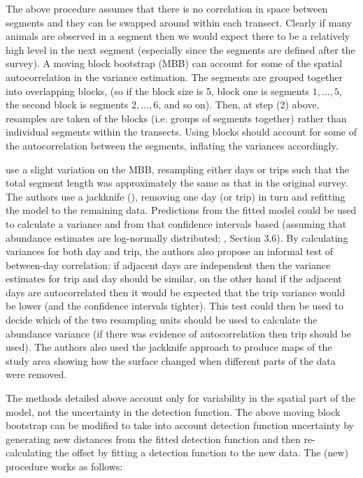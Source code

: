 \documentclass[a4paper,12pt]{article}
\begin{document}
The above procedure assumes that there is no correlation in space between segments and they can be swapped around within each transect. Clearly if many animals are observed in a segment then we would expect there to be a relatively high level in the next segment (especially since the segments are defined after the survey). A moving block bootstrap (MBB) can account for some of the spatial autocorrelation in the variance estimation. The segments are grouped together into overlapping blocks, (so if the block size is 5, block one is segments $1,\ldots,5$, the second block is segments $2,\ldots,6$, and so on). Then, at step (2) above, resamples are taken of the blocks (i.e. groups of segments together) rather than individual segments within the transects. Using blocks should account for some of the autocorrelation between the segments, inflating the variances accordingly.

\cite{Williams:2006tz} use a slight variation on the MBB, resampling either days or trips such that the total segment length was approximately the same as that in the original survey. The authors use a jackknife (\cite{Efron:1979ha}), removing one day (or trip) in turn and refitting the model to the remaining data. Predictions from the fitted model could be used to calculate a variance and from that confidence intervals based (assuming that abundance estimates are log-normally distributed; \cite{Buckland:2001vm}, Section 3.6). By calculating variances for both day and trip, the authors also propose an informal test of between-day correlation: if adjacent days are independent then the variance estimates for trip and day should be similar, on the other hand if the adjacent days are autocorrelated then it would be expected that the trip variance would be lower (and the confidence intervals tighter). This test could then be used to decide which of the two resampling units should be used to calculate the abundance variance (if there was evidence of autocorrelation then trip should be used). The authors also used the jackknife approach to produce maps of the study area showing how the surface changed when different parts of the data were removed.

The methods detailed above account only for variability in the spatial part of the model, not the uncertainty in the detection function. The above moving block bootstrap can be modified to take into account detection function uncertainty by generating new distances from the fitted detection function and then re-calculating the offset by fitting a detection function to the new data. The (new) procedure works as follows:
\end{document}
